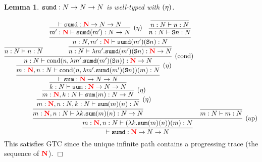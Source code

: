 \documentclass{article}
\newcommand{\bfColor}[2]{{\bf \color{#1}{#2}}}
\newcommand{\Reta}{\hbox{$(\eta)$}}
\newcommand{\Rap}{\hbox{$(\text{ap})$}}
\newcommand{\Rcond}{\hbox{$(\text{cond})$}}
\newcommand{\Sum}{{\tt sum}}
\newcommand{\Sumd}{{\tt sumd}}
\newcommand{\Cond}[2]{\text{cond}(#1,#2)}
\newcommand{\Suc}[1]{{\tt S}#1}
\newcommand{\N}{N}
\newcommand{\rN}{\bfColor{red}{N}}
\newtheorem{lemma}[theorem]{Lemma}
\newenvironment{proof}[1][Proof]{\begin{trivlist}
\item[\hskip \labelsep {\bfseries #1}]}{\end{trivlist}}
\begin{document}
\begin{lemma}
  $\Sumd:\N\to\N\to\N$ is well-typed with $\Reta$.
\end{lemma}
\begin{proof}
  \[
  \infer{
    \vdash \Sumd:\rN\to\N\to\N
  }{
    \infer[\Rap]{
      m:\rN, n:\N \vdash (\lambda k.\Sum(m)(n))(m):\N
    }{
      \infer{
        m:\rN, n:\N \vdash \lambda k.\Sum(m)(n):\N\to\N
      }{
        \infer[\Reta]{
          m:\rN, n:\N, k:\N \vdash \Sum(m)(n):\N
        }{
          \infer[\Reta]{
            m:\rN, k:\N \vdash \Sum(m):\N\to\N
          }{
            \infer{
              k:\N \vdash \Sum:\rN\to\N\to\N
            }{
              \infer{
                \vdash \Sum:\rN\to\N\to\N
              }{
                \infer[\Reta]{
                  m:\rN,n:\N\vdash\Cond{n}{\lambda m'.\Sumd(m')(\Suc{n})}(m):\N
                }{
                  \infer[\Rcond]{
                    n:\N\vdash\Cond{n}{\lambda m'.\Sumd(m')(\Suc{n})}:\rN\to\N
                  }{
                    \infer{
                      n:\N \vdash n:\N
                    }{}
                    &
                    \infer{
                      n:\N\vdash\lambda m'.\Sumd(m')(\Suc{n}):\rN\to\N
                    }{
                      \infer{
                        n:\N,m':\rN\vdash\Sumd(m')(\Suc{n}):\N
                      }{
                        \infer[\Reta]{
                          m':\rN\vdash\Sumd(m'):\N\to\N
                        }{
                          \vdash\Sumd:\rN\to\N\to\N
                        }
                        &
                        \infer{
                          n:\N\vdash\Suc{n}:\N
                        }{
                          \infer{
                            n:\N\vdash n:\N
                          }{}
                        }
                      }
                    }
                  }
                }
              }
            }
          }
        }
      }
      &
      \infer{
        m:\N \vdash m:\N
      }{}
    }
  }
  \]
  This satisfies GTC
  since the unique infinite path contains a progressing trace (the sequence of $\rN$).
  \hfill$\Box$
\end{proof}
\end{document}
